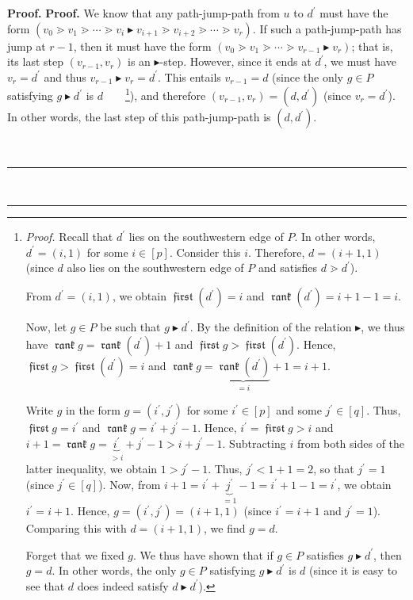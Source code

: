 \documentclass[numbers=enddot,12pt,final,onecolumn,notitlepage]{scrartcl}%
\theoremstyle{definition}
\newenvironment{verlong}{}{}
\DeclareMathOperator{\first}{\mathfrak{first}}
\DeclareMathOperator{\rank}{\mathfrak{rank}}
\newenvironment{proof}[1][Proof]{\noindent\textbf{#1.} }{\ \rule{0.5em}{0.5em}}
\begin{document}
\begin{proof}
\begin{proof}
\begin{verlong}
We know that any path-jump-path from $u$ to $d^{\prime}$ must have the form
\newline$\left(  v_{0}\gtrdot v_{1}\gtrdot\cdots\gtrdot v_{i}%
\blacktriangleright v_{i+1}\gtrdot v_{i+2}\gtrdot\cdots\gtrdot v_{r}\right)
$. If such a path-jump-path has jump at $r-1$, then it must have the form
$\left(  v_{0}\gtrdot v_{1}\gtrdot\cdots\gtrdot v_{r-1}\blacktriangleright
v_{r}\right)  $; that is, its last step $\left(  v_{r-1},v_{r}\right)  $ is an
$\blacktriangleright$-step. However, since it ends at $d^{\prime}$, we must
have $v_{r}=d^{\prime}$ and thus $v_{r-1}\blacktriangleright v_{r}=d^{\prime}%
$. This entails $v_{r-1}=d$ (since the only $g\in P$ satisfying
$g\blacktriangleright d^{\prime}$ is $d$\ \ \ \ \footnote{\textit{Proof.}
Recall that $d^{\prime}$ lies on the southwestern edge of $P$. In other words,
$d^{\prime}=\left(  i,1\right)  $ for some $i\in\left[  p\right]  $. Consider
this $i$. Therefore, $d=\left(  i+1,1\right)  $ (since $d$ also lies on the
southwestern edge of $P$ and satisfies $d\gtrdot d^{\prime}$).
\par
From $d^{\prime}=\left(  i,1\right)  $, we obtain $\first \left(  d^{\prime
}\right)  =i$ and $\rank \left(  d^{\prime}\right)  =i+1-1=i$.
\par
Now, let $g\in P$ be such that $g\blacktriangleright d^{\prime}$. By the
definition of the relation $\blacktriangleright$, we thus have
$\rank g=\rank \left(  d^{\prime}\right)  +1$ and $\first g>\first \left(
d^{\prime}\right)  $. Hence, $\first g>\first \left(  d^{\prime}\right)  =i$
and $\rank g=\underbrace{\rank \left(  d^{\prime}\right)  }_{=i}+1=i+1$.
\par
Write $g$ in the form $g=\left(  i^{\prime},j^{\prime}\right)  $ for some
$i^{\prime}\in\left[  p\right]  $ and some $j^{\prime}\in\left[  q\right]  $.
Thus, $\first g=i^{\prime}$ and $\rank g=i^{\prime}+j^{\prime}-1$. Hence,
$i^{\prime}=\first g>i$ and $i+1=\rank g=\underbrace{i^{\prime}}%
_{>i}+j^{\prime}-1>i+j^{\prime}-1$. Subtracting $i$ from both sides of the
latter inequality, we obtain $1>j^{\prime}-1$. Thus, $j^{\prime}<1+1=2$, so
that $j^{\prime}=1$ (since $j^{\prime}\in\left[  q\right]  $). Now, from
$i+1=i^{\prime}+\underbrace{j^{\prime}}_{=1}-1=i^{\prime}+1-1=i^{\prime}$, we
obtain $i^{\prime}=i+1$. Hence, $g=\left(  i^{\prime},j^{\prime}\right)
=\left(  i+1,1\right)  $ (since $i^{\prime}=i+1$ and $j^{\prime}=1$).
Comparing this with $d=\left(  i+1,1\right)  $, we find $g=d$.
\par
Forget that we fixed $g$. We thus have shown that if $g\in P$ satisfies
$g\blacktriangleright d^{\prime}$, then $g=d$. In other words, the only $g\in
P$ satisfying $g\blacktriangleright d^{\prime}$ is $d$ (since it is easy to
see that $d$ does indeed satisfy $d\blacktriangleright d^{\prime}$).}), and
therefore $\left(  v_{r-1},v_{r}\right)  =\left(  d,d^{\prime}\right)  $
(since $v_{r}=d^{\prime}$). In other words, the last step of this
path-jump-path is $\left(  d,d^{\prime}\right)  $.
\end{verlong}


\end{proof}
\end{proof}
\end{document}
